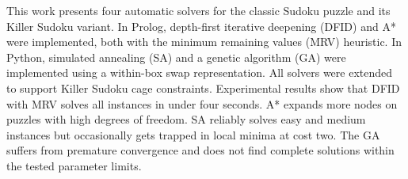 \abstractEN %

This work presents four automatic solvers for the classic Sudoku puzzle and its Killer Sudoku variant. In Prolog, depth-first iterative deepening (DFID) and A* were implemented, both with the minimum remaining values (MRV) heuristic. In Python, simulated annealing (SA) and a genetic algorithm (GA) were implemented using a within-box swap representation. All solvers were extended to support Killer Sudoku cage constraints. Experimental results show that DFID with MRV solves all instances in under four seconds. A* expands more nodes on puzzles with high degrees of freedom. SA reliably solves easy and medium instances but occasionally gets trapped in local minima at cost two. The GA suffers from premature convergence and does not find complete solutions within the tested parameter limits.
